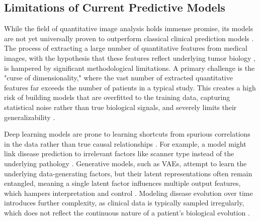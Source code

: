 \documentclass[11pt, a4paper]{article}
\begin{document}
\subsection{Limitations of Current Predictive Models}
While the field of quantitative image analysis holds immense promise, its models are not yet universally proven to outperform classical clinical prediction models \cite{MolinBarry2024, FerroCobelli2022}. The process of extracting a large number of quantitative features from medical images, with the hypothesis that these features reflect underlying tumor biology \cite{MohseniniaZamaniSiahkali2024}, is hampered by significant methodological limitations. A primary challenge is the "curse of dimensionality," where the vast number of extracted quantitative features far exceeds the number of patients in a typical study. This creates a high risk of building models that are overfitted to the training data, capturing statistical noise rather than true biological signals, and severely limits their generalizability \cite{KendrickFrancis2021, GinsburgRsu2014}.

Deep learning models are prone to learning shortcuts from spurious correlations in the data rather than true causal relationships \cite{AydinHilbert2024, FayCobos2023}. For example, a model might link disease prediction to irrelevant factors like scanner type instead of the underlying pathology \cite{FayCobos2023, VigneshwaranOhara2024}. Generative models, such as VAEs, attempt to learn the underlying data-generating factors, but their latent representations often remain entangled, meaning a single latent factor influences multiple output features, which hampers interpretation and control \cite{CetinStephens2022}. Modeling disease evolution over time introduces further complexity, as clinical data is typically sampled irregularly, which does not reflect the continuous nature of a patient's biological evolution \cite{SeedatImrie2022, Purohit2023}.
\end{document}
